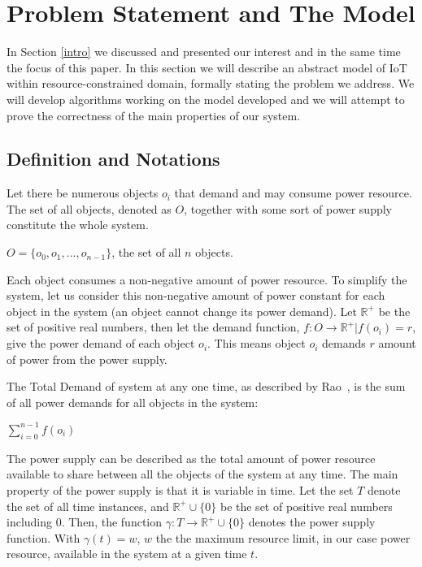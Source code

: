 \documentclass[../main/IoT.tex]{subfiles}
\begin{document}
\section{Problem Statement and The Model}\label{problem}
In Section \ref{intro} we discussed and presented our interest and in the same time the focus of this paper. In this section we will describe an abstract model of IoT within resource-constrained domain, formally stating the problem we address. We will develop algorithms working on the model developed and we will attempt to prove the correctness of the main properties of our system.

\subsection{Definition and Notations}
Let there be numerous objects $o_{i}$ that demand and may consume power resource. The set of all objects, denoted as $O$, together with some sort of power supply constitute the whole system.
 \begin{center}
    $O=\{o_{0}, o_{1}, ...,o_{n-1}\}$, the set of all $n$ objects.
 \end{center}
Each object consumes a non-negative amount of power resource. To simplify the system, let us consider this non-negative amount of power constant for each object in the system (an object cannot change its power demand). Let $\mathbb{R^+}$ be the set of positive real numbers, then let the demand function, $f:O\rightarrow\mathbb{R^+} | f(o_{i})=r$, give the power demand of each object $o_{i}$. This means object $o_{i}$ demands $r$ amount of power from the power supply.

The Total Demand of system at any one time, as described by Rao~\cite{rao2011foundation}, is the sum of all power demands for all objects in the system:
\begin{center}
   $\sum\limits_{i=0}^{n-1} f(o_i)$
\end{center}

The power supply can be described as the total amount of power resource available to share between all the objects of the system at any time. The main property of the power supply is that it is variable in time. Let the set $T$ denote the set of all time instances, and $\mathbb{R^+}\cup\{0\}$ be the set of positive real numbers including $0$. Then, the function $\gamma:T\rightarrow\mathbb{R^+}\cup\{0\}$ denotes the power supply function. With $\gamma(t)= w$, $w$ the \cite{rao2011foundation} the maximum resource limit, in our case power resource, available in the system at a given time $t$.
\end{document}

